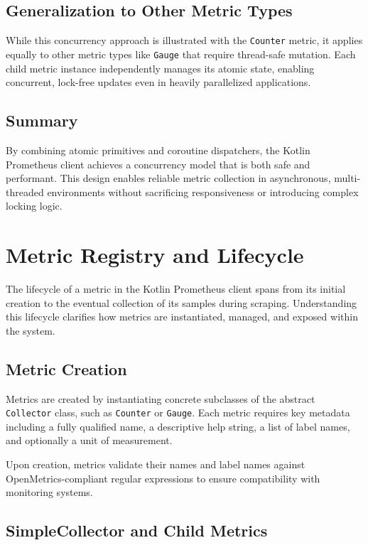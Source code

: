 \subsection{Generalization to Other Metric Types}

While this concurrency approach is illustrated with the \texttt{Counter} metric, it applies equally to other metric types like \texttt{Gauge} that require thread-safe mutation. Each child metric instance independently manages its atomic state, enabling concurrent, lock-free updates even in heavily parallelized applications.

\subsection{Summary}

By combining atomic primitives and coroutine dispatchers, the Kotlin Prometheus client achieves a concurrency model that is both safe and performant. This design enables reliable metric collection in asynchronous, multi-threaded environments without sacrificing responsiveness or introducing complex locking logic.
\section{Metric Registry and Lifecycle}

The lifecycle of a metric in the Kotlin Prometheus client spans from its initial creation to the eventual collection of its samples during scraping. Understanding this lifecycle clarifies how metrics are instantiated, managed, and exposed within the system.

\subsection{Metric Creation}

Metrics are created by instantiating concrete subclasses of the abstract \texttt{Collector} class, such as \texttt{Counter} or \texttt{Gauge}. Each metric requires key metadata including a fully qualified name, a descriptive help string, a list of label names, and optionally a unit of measurement.

Upon creation, metrics validate their names and label names against OpenMetrics-compliant regular expressions to ensure compatibility with monitoring systems.

\subsection{SimpleCollector and Child Metrics}

